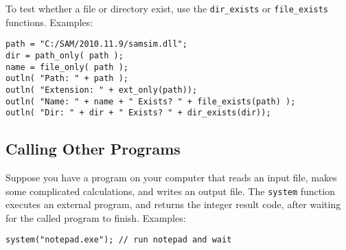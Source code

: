 \documentclass{article}
\begin{document}
To test whether a file or directory exist, use the \texttt{dir\_exists} or \texttt{file\_exists} functions.  Examples:

\begin{verbatim}
path = "C:/SAM/2010.11.9/samsim.dll";
dir = path_only( path );
name = file_only( path );
outln( "Path: " + path );
outln( "Extension: " + ext_only(path));
outln( "Name: " + name + " Exists? " + file_exists(path) );
outln( "Dir: " + dir + " Exists? " + dir_exists(dir));
\end{verbatim}




%   

\subsection{Calling Other Programs}

Suppose you have a program on your computer that reads an input file, makes some complicated calculations, and writes an output file.  The \texttt{system} function executes an external program, and returns the integer result code, after waiting for the called program to finish.  Examples:

\begin{verbatim}
system("notepad.exe"); // run notepad and wait
\end{verbatim}
\end{document}
